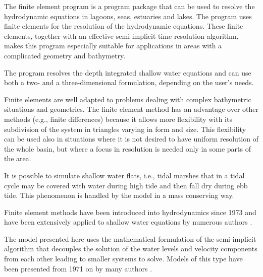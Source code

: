 
%
%
%
%
%
%
%

The finite element program \shy{} is a program package that can be
used to resolve the hydrodynamic equations in lagoons, seas, estuaries
and lakes. The program uses finite elements for the resolution of
the hydrodynamic equations. These finite elements, together with an
effective semi-implicit time resolution algorithm, makes this program
especially suitable for applications in areas with a complicated geometry
and bathymetry.

The program \shy{} resolves the depth integrated shallow water equations
and can use both a two- and a three-dimensional formulation, depending
on the user's needs.

Finite elements are well adapted to problems dealing with complex
bathymetric situations and geometries.  The finite element method has
an advantage over other methods (e.g., finite differences) because it
allows more flexibility with its subdivision of the system in triangles
varying in form and size.  This flexibility can be used also in situations
where it is not desired to have uniform resolution of the whole basin,
but where a focus in resolution is needed only in some parts of the area.

It is possible to simulate shallow water flats, i.e., tidal marshes
that in a tidal cycle may be covered with water during high tide and
then fall dry during ebb tide. This phenomenon is handled by the model
in a mass conserving way.

Finite element methods have been introduced into hydrodynamics since 1973
and have been extensively applied to shallow water equations by numerous
authors \cite{Grotkop73, Taylor75, Herrling77, Herrling78, Holz82}.


The model presented here \cite{Umgies86, Umgies93} uses the mathematical
formulation of the semi-implicit algorithm that decouples the solution
of the water levels and velocity components from each other leading to
smaller systems to solve. Models of this type have been presented from
1971 on by many authors \cite{Kwizak71, Duwe82, Backhaus83}.

